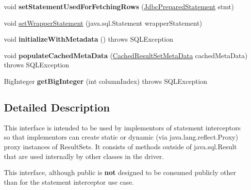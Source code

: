 \begin{DoxyCompactItemize}
void {\bfseries set\+Statement\+Used\+For\+Fetching\+Rows} (\mbox{\hyperlink{interfacecom_1_1mysql_1_1cj_1_1jdbc_1_1_jdbc_prepared_statement}{Jdbc\+Prepared\+Statement}} stmt)
\item 
void \mbox{\hyperlink{interfacecom_1_1mysql_1_1cj_1_1jdbc_1_1result_1_1_result_set_internal_methods_aeaa719d2c55d3e0c32bd5b47b4020009}{set\+Wrapper\+Statement}} (java.\+sql.\+Statement wrapper\+Statement)
\item 
\mbox{\label{interfacecom_1_1mysql_1_1cj_1_1jdbc_1_1result_1_1_result_set_internal_methods_aee66378b04271c5eacc9811a8d884a06}} 
void {\bfseries initialize\+With\+Metadata} ()  throws S\+Q\+L\+Exception
\item 
\mbox{\label{interfacecom_1_1mysql_1_1cj_1_1jdbc_1_1result_1_1_result_set_internal_methods_ac9b67f368406db152383d3244f7c2d08}} 
void {\bfseries populate\+Cached\+Meta\+Data} (\mbox{\hyperlink{interfacecom_1_1mysql_1_1cj_1_1jdbc_1_1result_1_1_cached_result_set_meta_data}{Cached\+Result\+Set\+Meta\+Data}} cached\+Meta\+Data)  throws S\+Q\+L\+Exception
\item 
\mbox{\label{interfacecom_1_1mysql_1_1cj_1_1jdbc_1_1result_1_1_result_set_internal_methods_abc94356474330c07d9404386b2a373b5}} 
Big\+Integer {\bfseries get\+Big\+Integer} (int column\+Index)  throws S\+Q\+L\+Exception
\end{DoxyCompactItemize}


\subsection{Detailed Description}
This interface is intended to be used by implementors of statement interceptors so that implementors can create static or dynamic (via java.\+lang.\+reflect.\+Proxy) proxy instances of Result\+Sets. It consists of methods outside of java.\+sql.\+Result that are used internally by other classes in the driver.

This interface, although public is {\bfseries not} designed to be consumed publicly other than for the statement interceptor use case. 

